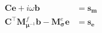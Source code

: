 \begin{equation}
    \begin{split}
        \mathbf{C} \mathbf{e} + i\omega\mathbf{b} &= \mathbf{s_m} \\
        \mathbf{C}^\top \mathbf{M}_{\boldsymbol{\mu}^{-1}}^f \mathbf{b} - \mathbf{M}_{\boldsymbol{\sigma}}^e \mathbf{e} &= \mathbf{s_e}
    \end{split}
    \label{eq:DiscreteFDEMEB}
\end{equation}
